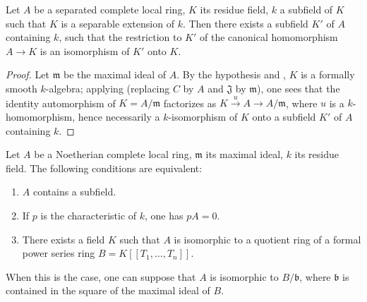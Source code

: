 \begin{corollary}[19.6.2]
\label{0.19.6.2}
Let $A$ be a separated complete local ring, $K$ its residue field, $k$ a subfield of $K$ such that $K$ is a separable extension of $k$.
Then there exists a subfield $K'$ of $A$ containing $k$, such that the restriction to $K'$ of the canonical homomorphism $A\to K$ is an isomorphism of $K'$ onto $K$.
\end{corollary}

\begin{proof}
Let $\mathfrak{m}$ be the maximal ideal of $A$.
By the hypothesis and , $K$ is a formally smooth $k$-algebra;
applying  (replacing $C$ by $A$ and $\mathfrak{J}$ by $\mathfrak{m}$), one sees that the identity automorphism of $K=A/\mathfrak{m}$ factorizes as $K\xrightarrow{u}A\to A/\mathfrak{m}$, where $u$ is a $k$-homomorphism, hence necessarily a $k$-isomorphism of $K$ onto a subfield $K'$ of $A$ containing $k$.
\end{proof}

\begin{corollary}[19.6.3]
\label{0.19.6.3}
Let $A$ be a Noetherian complete local ring, $\mathfrak{m}$ its maximal ideal, $k$ its residue field.
The following conditions are equivalent:
\begin{enumerate}
  \item[\textup{a)}] $A$ contains a subfield.
  \item[\textup{b)}] If $p$ is the characteristic of $k$, one has $pA=0$.
  \item[\textup{c)}] There exists a field $K$ such that $A$ is isomorphic to a quotient ring of a formal power series ring $B=K[[T_1,\ldots,T_n]]$.
\end{enumerate}
When this is the case, one can suppose that $A$ is isomorphic to $B/\mathfrak{b}$, where $\mathfrak{b}$ is contained in the square of the maximal ideal of $B$.
\end{corollary}

